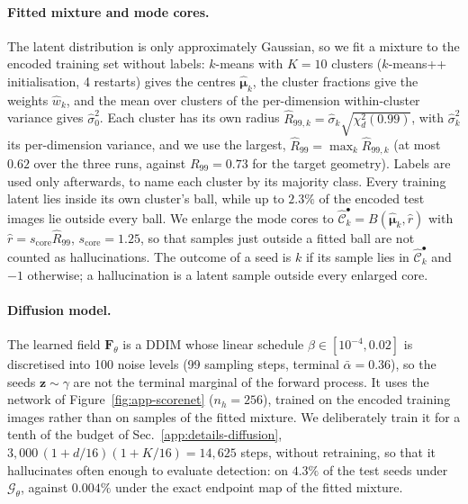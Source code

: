 \paragraph{Fitted mixture and mode cores.}
The latent distribution is only approximately Gaussian, so we fit a mixture to the encoded training
set without labels: $k$-means with $K = 10$ clusters ($k$-means++ initialisation, 4 restarts) gives
the centres $\hat{\boldsymbol{\mu}}_k$, the cluster fractions give the weights $\hat w_k$, and the
mean over clusters of the per-dimension within-cluster variance gives $\hat\sigma_0^2$. Each cluster
has its own radius $\hat R_{99,k} = \hat\sigma_k \sqrt{\chi^2_d(0.99)}$, with $\hat\sigma_k^2$ its
per-dimension variance, and we use the largest, $\hat R_{99} = \max_k \hat R_{99,k}$ (at most $0.62$
over the three runs, against $R_{99} = 0.73$ for the target geometry). Labels are used only
afterwards, to name each cluster by its majority class. Every training latent lies inside its own
cluster's ball, while up to $2.3\%$ of the encoded test images lie outside every ball. We enlarge
the mode cores to $\hat{\mathcal{C}}_k^\bullet = B(\hat{\boldsymbol{\mu}}_k, \hat r)$ with
$\hat r = s_{\text{core}} \hat R_{99}$, $s_{\text{core}} = 1.25$, so that samples just outside a
fitted ball are not counted as hallucinations. The outcome of a seed is $k$ if its sample lies in
$\hat{\mathcal{C}}_k^\bullet$ and $-1$ otherwise; a hallucination is a latent sample outside every
enlarged core.

\paragraph{Diffusion model.}
The learned field $\boldsymbol{F}_\theta$ is a DDIM whose linear schedule
$\beta \in [10^{-4}, 0.02]$ is discretised into 100 noise levels (99 sampling steps, terminal
$\bar\alpha = 0.36$), so the seeds $\boldsymbol{z} \sim \gamma$ are not the terminal marginal of
the forward process. It uses the network of Figure~\ref{fig:app-scorenet} ($n_h = 256$), trained
on the encoded training images rather than on samples of the fitted mixture. We deliberately train
it for a tenth of the budget of Sec.~\ref{app:details-diffusion},
$3{,}000\,(1 + d/16)(1 + K/16) = 14{,}625$ steps, without retraining, so that it hallucinates often
enough to evaluate detection: on $4.3\%$ of the test seeds under $\mathcal{G}_\theta$, against
$0.004\%$ under the exact endpoint map of the fitted mixture.

